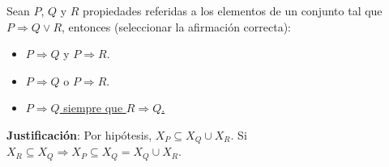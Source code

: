 \begin{ejercicio}
    Sean $P$, $Q$ y $R$ propiedades referidas a los elementos de un conjunto tal que $P \Rightarrow Q \lor R$, entonces (seleccionar la afirmación correcta):
    \begin{itemize}
        \item $P \Rightarrow Q$ y $P \Rightarrow R$.
        \item $P \Rightarrow Q$ o $P \Rightarrow R$.
        \item \underline{$P \Rightarrow Q$ siempre que $R \Rightarrow Q$.}
    \end{itemize}

    \noindent
    \textbf{Justificación}:
    Por hipótesis, $X_P \subseteq X_Q \cup X_R$.\newline
    Si $X_R \subseteq X_Q \Rightarrow X_P \subseteq X_Q = X_Q \cup X_R$.

\end{ejercicio}

\newpage
\resetearcontador

